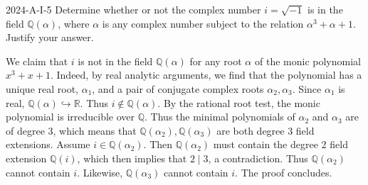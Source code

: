 \documentclass{article}
\newcommand{\embedd}{\hookrightarrow}
\begin{document}
	\begin{prb}{2024-A-I-5}
		Determine whether or not the complex number $i = \sqrt{-1}$ is in the field $\mathbb{Q}(\alpha)$, where $\alpha$ is any complex number subject to the relation $\alpha^{3} + \alpha + 1$. Justify your answer. 
	\end{prb}
	We claim that $i$ is not in the field $\mathbb{Q}(\alpha)$ for any root $\alpha$ of the monic polynomial $x^{3} + x + 1$. Indeed, by real analytic arguments, we find that the polynomial has a unique real root, $\alpha_{1}$, and a pair of conjugate complex roots $\alpha_{2}, \alpha_{3}$. Since $\alpha_{1}$ is real, $\mathbb{Q}(\alpha) \embedd \mathbb{R}$. Thus $i \notin \mathbb{Q}(\alpha)$. By the rational root test, the monic polynomial is irreducible over $\mathbb{Q}$. Thus the minimal polynomials of $\alpha_{2}$ and $\alpha_{3}$ are of degree 3, which means that $\mathbb{Q}(\alpha_{2}), \mathbb{Q}(\alpha_{3})$ are both degree 3 field extensions. Assume $i \in \mathbb{Q}(\alpha_{2})$. Then $\mathbb{Q}(\alpha_{2})$ must contain the degree 2 field extension $\mathbb{Q}(i)$, which then implies that $2 \mid 3$, a contradiction. Thus $\mathbb{Q}(\alpha_{2})$ cannot contain $i$. Likewise, $\mathbb{Q}(\alpha_{3})$ cannot contain $i$. The proof concludes. 
	
\end{document}
